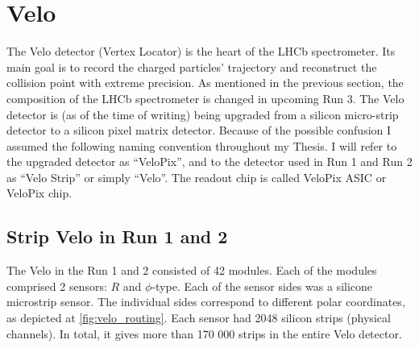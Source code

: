 \section{Velo}

The Velo detector (Vertex Locator) is the heart of the LHCb spectrometer.
Its main goal is to record the charged particles' trajectory and reconstruct the collision point with extreme precision. As mentioned in the previous section, the composition of the LHCb spectrometer is changed in upcoming Run 3. The Velo detector is (as of the time of writing) being upgraded from a silicon micro-strip detector to a silicon pixel matrix detector. Because of the possible confusion I assumed the following naming convention throughout my Thesis. I will refer to the upgraded detector as ``VeloPix'', and to the detector used in Run 1 and Run 2 as  ``Velo Strip'' or simply ``Velo''. The readout chip is called VeloPix ASIC or VeloPix chip.

\subsection{Strip Velo in Run 1 and 2}

The Velo in the Run 1 and 2 consisted of 42 modules.
Each of the modules comprised 2 sensors: $R$ and $\phi$-type.
Each of the sensor sides was a silicone microstrip sensor.
The individual sides correspond to different polar coordinates, as depicted at \ref{fig:velo_routing}.
Each sensor had 2048 silicon strips (physical channels).
In total, it gives more than 170 000 strips in the entire Velo detector.


